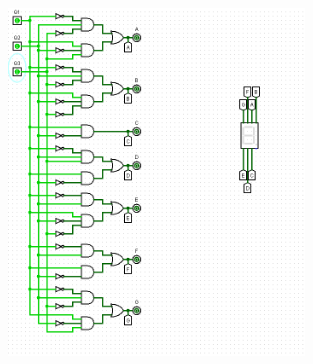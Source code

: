 \documentclass[]{article}
\begin{document}
\begin{figure}[H]
	\centering
	\includegraphics[width=0.7\textwidth]{TTRZY_111.png}
\end{figure}
\end{document}
